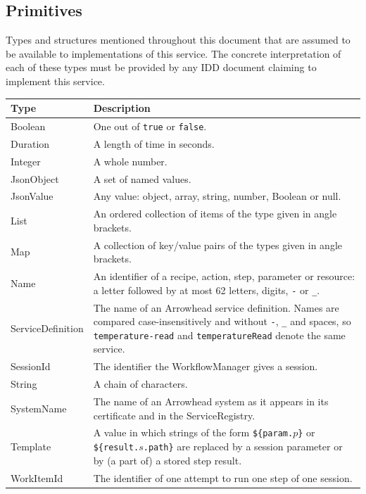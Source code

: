 \documentclass[a4paper]{arrowhead}
\newcommand{\pdef}[1]{{\textcolor{ArrowheadGrey}{#1\label{sec:model:primitives:#1}\label{sec:model:primitives:#1s}\label{sec:model:primitives:#1es}}}}
\begin{document}
\subsection{Primitives}
\label{sec:model:primitives}
Types and structures mentioned throughout this document that are assumed to be available to implementations of this
service. The concrete interpretation of each of these types must be provided by any IDD document claiming to implement
this service.

{\small
\begin{longtable}{|p{3.2cm}|p{12.6cm}|}

\hline
\rowcolor{gray!33} Type & Description \\ \hline
\endhead
\pdef{Boolean} & One out of \texttt{true} or \texttt{false}. \\ \hline
\pdef{Duration} & A length of time in seconds. \\ \hline
\pdef{Integer} & A whole number. \\ \hline
\pdef{JsonObject} & A set of named values. \\ \hline
\pdef{JsonValue} & Any value: object, array, string, number, Boolean or null. \\ \hline
\pdef{List} & An ordered collection of items of the type given in angle brackets. \\ \hline
\pdef{Map} & A collection of key/value pairs of the types given in angle brackets. \\ \hline
\pdef{Name} & An identifier of a recipe, action, step, parameter or resource: a letter followed by at most 62 letters, digits, \texttt{-} or \texttt{\_}. \\ \hline
\pdef{ServiceDefinition} & The name of an Arrowhead service definition. Names are compared case-insensitively and without \texttt{-}, \texttt{\_} and spaces, so \texttt{temperature-\allowbreak{}read} and \texttt{temperature\allowbreak{}Read} denote the same service. \\ \hline
\pdef{SessionId} & The identifier the WorkflowManager gives a session. \\ \hline
\pdef{String} & A chain of characters. \\ \hline
\pdef{SystemName} & The name of an Arrowhead system as it appears in its certificate and in the ServiceRegistry. \\ \hline
\pdef{Template} & A value in which strings of the form \texttt{\$\{param.$p$\}} or \texttt{\$\{result.$s$.path\}} are replaced by a session parameter or by (a part of) a stored step result. \\ \hline
\pdef{WorkItemId} & The identifier of one attempt to run one step of one session. \\ \hline
\end{longtable}
}
\end{document}
